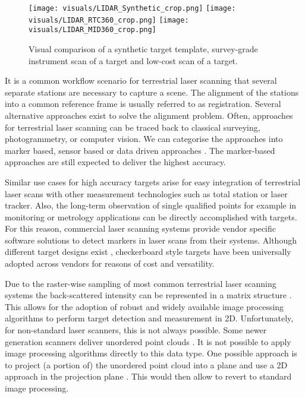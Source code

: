 
\begin{figure*}[ht]
  \texttt{[image: visuals/LIDAR\_Synthetic\_crop.png]}
\endminipage\hfill
{}
  \texttt{[image: visuals/LIDAR\_RTC360\_crop.png]}
\endminipage\hfill
{}%
  \texttt{[image: visuals/LIDAR\_MID360\_crop.png]}
\endminipage
\caption{Visual comparison of a synthetic target template, survey-grade instrument scan of a target and low-cost scan of a target.}
\label{fig:target_visual}
\end{figure*}

It is a common workflow scenario for terrestrial laser scanning that several separate stations are necessary to capture a scene. The alignment of the stations into a common reference frame is usually referred to as registration. Several alternative approaches exist to solve the alignment problem. Often, approaches for terrestrial laser scanning can be traced back to classical surveying, photogrammetry, or computer vision. We can categorise the approaches into marker based, sensor based or data driven approaches \citep{pfeifer_early_2008}. The marker-based approaches are still expected to deliver the highest accuracy. 

Similar use cases for high accuracy targets arise for easy integration of terrestrial laser scans with other measurement technologies such as total station or laser tracker. Also, the long-term observation of single qualified points for example in monitoring or metrology applications can be directly accomplished with targets. For this reason, commercial laser scanning systems provide vendor specific software solutions to detect markers in laser scans from their systems. Although different target designs exist \citep{jansen_decreasing_2019}, checkerboard style targets have been universally adopted across vendors for reasons of cost and versatility.

Due to the raster-wise sampling of most common terrestrial laser scanning systems the back-scattered intensity can be represented in a matrix structure \citep{bohm_automatic_2007,sanchez_castillo_semantic_2021}. This allows for the adoption of robust and widely available image processing algorithms to perform target detection and measurement in 2D. Unfortunately, for non-standard laser scanners, this is not always possible. Some newer generation scanners deliver unordered point clouds \citep{arteaga2019}. It is not possible to apply image processing algorithms directly to this data type. One possible approach is to project (a portion of) the unordered point cloud into a plane and use a 2D approach in the projection plane \citep{ge_target_2015, goo2024zero}. This would then allow to revert to standard image processing. 

